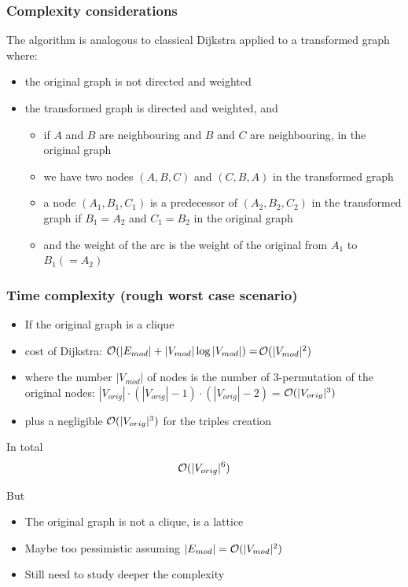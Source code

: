 \begin{frame}
  \frametitle{Complexity considerations}
  The algorithm is analogous to classical \alert{Dijkstra} applied to a
  \alert{transformed} graph where:\pause
  \begin{itemize}
  \item the original graph is \alert{not} directed and weighted\pause
  \item the transformed graph is \alert{directed} and weighted,
    and\pause
    \begin{itemize}
    \item if \alert{$A$} and \alert{$B$} are \alert{neighbouring} and
      \alert{$B$} and \alert{$C$} are \alert{neighbouring}, in the original graph\pause
    \item we have two nodes \alert{$(A,B,C)$} and
      \alert{$(C,B,A)$} in the transformed graph\pause
    \item a node \alert{$(A_1,B_1,C_1)$} is a predecessor of
      \alert{$(A_2,B_2,C_2)$} in the transformed graph if
      \alert{$B_1=A_2$} and \alert{$C_1=B_2$} in the original graph\pause
    \item and the weight of the arc is the weight of the original from
      \alert{$A_1$} to \alert{$B_1(=A_2)$}
    \end{itemize}
  \end{itemize}
\end{frame}

\begin{frame}
  \frametitle{Time complexity (rough worst case scenario)}
  \begin{itemize}
  \item If the original graph is a \alert{clique}\pause
  \item cost of \alert{Dijkstra}: $\mathcal{O}(|E_{mod}|+|V_{mod}|\log |V_{mod}|)=$\alert{$\mathcal{O}(|V_{mod}|^2)$}\pause
  \item where the number $|V_{mod}|$ of nodes is the
    number of 3-permutation of the original nodes: $|V_{orig}|\cdot
    (|V_{orig}|-1)\cdot(|V_{orig}|-2)=$\alert{$\mathcal{O}(|V_{orig}|^3)$}\pause
  \item plus a negligible \alert{$\mathcal{O}(|V_{orig}|^3)$} for the triples
    creation\pause
  \end{itemize}
  \begin{block}{In total}
    \alert{$$\mathcal{O}(|V_{orig}|^6)$$}
  \end{block}
  \pause
  \begin{block}{But}
    \begin{itemize}
    \item The original graph is not a \alert{clique}, is a
      lattice\pause
    \item Maybe too pessimistic assuming
      $|E_{mod}|=\mathcal{O}(|V_{mod}|^2)$\pause
    \item Still need to study deeper the complexity
    \end{itemize}
  \end{block}
\end{frame}

